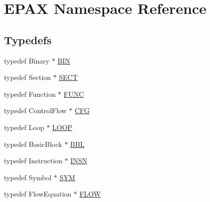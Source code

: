 \hypertarget{namespace_e_p_a_x}{\section{\-E\-P\-A\-X \-Namespace \-Reference}
\label{namespace_e_p_a_x}
}
\subsection*{\-Typedefs}
\begin{DoxyCompactItemize}
\item 
typedef \-Binary $\ast$ \hyperlink{namespace_e_p_a_x_ad71db9d891528e4a8b303787dff8ac0b}{\-B\-I\-N}
\item 
typedef \-Section $\ast$ \hyperlink{namespace_e_p_a_x_a6c4fe59392073737d60d4b99f37ba154}{\-S\-E\-C\-T}
\item 
typedef \-Function $\ast$ \hyperlink{namespace_e_p_a_x_a5b05cc89d633ec2241cb3af828c03024}{\-F\-U\-N\-C}
\item 
typedef \-Control\-Flow $\ast$ \hyperlink{namespace_e_p_a_x_a6edfef502c4f06240ec12097855e17dd}{\-C\-F\-G}
\item 
typedef \-Loop $\ast$ \hyperlink{namespace_e_p_a_x_ac236645423e99e8ccc784040ff1f881e}{\-L\-O\-O\-P}
\item 
typedef \-Basic\-Block $\ast$ \hyperlink{namespace_e_p_a_x_a0ad4f6573b03fa5c375bed0e68d4fab0}{\-B\-B\-L}
\item 
typedef \-Instruction $\ast$ \hyperlink{namespace_e_p_a_x_a601da5f2ead9a877d566da6cfc9026eb}{\-I\-N\-S\-N}
\item 
typedef \-Symbol $\ast$ \hyperlink{namespace_e_p_a_x_acad75cfc5d20dbf9de18b17dfe451b42}{\-S\-Y\-M}
\item 
typedef \-Flow\-Equation $\ast$ \hyperlink{namespace_e_p_a_x_a289a37f4d34ed51ee92cbd8c601db421}{\-F\-L\-O\-W}
\end{DoxyCompactItemize}

